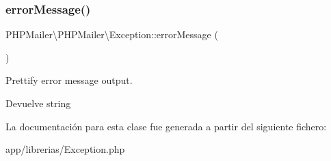 \subsubsection{\texorpdfstring{error\+Message()}{errorMessage()}}
{\footnotesize\ttfamily P\+H\+P\+Mailer\textbackslash{}\+P\+H\+P\+Mailer\textbackslash{}\+Exception\+::error\+Message (\begin{DoxyParamCaption}{ }\end{DoxyParamCaption})}

Prettify error message output.

\begin{DoxyReturn}{Devuelve}
string 
\end{DoxyReturn}


La documentación para esta clase fue generada a partir del siguiente fichero\+:\begin{DoxyCompactItemize}
\item 
app/librerias/Exception.\+php\end{DoxyCompactItemize}
